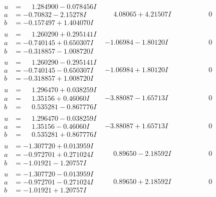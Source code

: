 \documentclass[1p]{elsarticle_modified}
\theoremstyle{definition}
\begin{document}
$$\begin{array}{c|c|c}
\begin{aligned}
u &= \phantom{-}1.284900 - 0.078456 I \\
a &= -0.70832 - 2.15278 I \\
b &= -0.157497 + 1.404070 I\end{aligned}
 & \phantom{-}4.08065 + 4.21507 I & \phantom{-0.000000 } 0 \\ \hline\begin{aligned}
u &= \phantom{-}1.260290 + 0.295141 I \\
a &= -0.740145 + 0.650307 I \\
b &= -0.318857 - 1.008720 I\end{aligned}
 & -1.06984 - 1.80120 I & \phantom{-0.000000 } 0 \\ \hline\begin{aligned}
u &= \phantom{-}1.260290 - 0.295141 I \\
a &= -0.740145 - 0.650307 I \\
b &= -0.318857 + 1.008720 I\end{aligned}
 & -1.06984 + 1.80120 I & \phantom{-0.000000 } 0 \\ \hline\begin{aligned}
u &= \phantom{-}1.296470 + 0.038259 I \\
a &= \phantom{-}1.35156 + 0.46060 I \\
b &= \phantom{-}0.535281 - 0.867776 I\end{aligned}
 & -3.88087 - 1.65713 I & \phantom{-0.000000 } 0 \\ \hline\begin{aligned}
u &= \phantom{-}1.296470 - 0.038259 I \\
a &= \phantom{-}1.35156 - 0.46060 I \\
b &= \phantom{-}0.535281 + 0.867776 I\end{aligned}
 & -3.88087 + 1.65713 I & \phantom{-0.000000 } 0 \\ \hline\begin{aligned}
u &= -1.307720 + 0.013959 I \\
a &= -0.972701 + 0.271024 I \\
b &= -1.01921 - 1.20757 I\end{aligned}
 & \phantom{-}0.89650 - 2.18592 I & \phantom{-0.000000 } 0 \\ \hline\begin{aligned}
u &= -1.307720 - 0.013959 I \\
a &= -0.972701 - 0.271024 I \\
b &= -1.01921 + 1.20757 I\end{aligned}
 & \phantom{-}0.89650 + 2.18592 I & \phantom{-0.000000 } 0 \\ \hline\begin{aligned}

\end{aligned}
\end{array}$$
\end{document}
